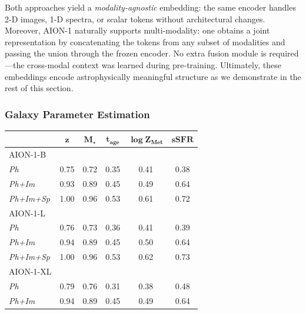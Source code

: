 \documentclass[]{polymathic}
\begin{document}
Both approaches yield a \emph{modality-agnostic} embedding: the same encoder handles 2-D images, 1-D spectra, or scalar tokens without architectural changes.  Moreover, AION-1 naturally supports multi-modality: one obtains a joint representation by concatenating the tokens from any subset of modalities and passing the union through the frozen encoder.  No extra fusion module is required—the cross-modal context was learned during pre-training. Ultimately, these embeddings encode astrophysically meaningful structure as we demonstrate in the rest of this section.

\subsubsection{Galaxy Parameter Estimation}

\begin{table}
\centering
\small
\begin{tabular}{l
                c  %
                c  %
                c  %
                c  %
                c  %
               }
\toprule
 & $\mathbf{z}$ & $\mathbf{M_\star}$ & $\mathbf{t_{age}}$ & $\mathbf{\log Z_{\!Met}}$ & $\mathbf{sSFR}$ \\
\midrule
AION-1-B & & & & & \\
\hspace{1mm}\textit{Ph}            & 0.75 & 0.72 & 0.35 & 0.41 & 0.38 \\
\hspace{1mm}\textit{Ph+Im}         & 0.93 & 0.89 & 0.45 & 0.49 & 0.64 \\
\hspace{1mm}\textit{Ph+Im+Sp}      & 1.00 & 0.96 & 0.53 & 0.61 & 0.72 \\[2pt]
AION-1-L & & & & & \\
\hspace{1mm}\textit{Ph}            & 0.76 & 0.73 & 0.36 & 0.41 & 0.39 \\
\hspace{1mm}\textit{Ph+Im}         & 0.94 & 0.89 & 0.45 & 0.50 & 0.64 \\
\hspace{1mm}\textit{Ph+Im+Sp}      & 1.00 & 0.96 & 0.53 & 0.62 & 0.73 \\[2pt]
AION-1-XL & & & & & \\
\hspace{1mm}\textit{Ph}            & 0.79 & 0.76 & 0.31 & 0.38 & 0.48 \\
\hspace{1mm}\textit{Ph+Im}         & 0.94 & 0.89 & 0.45 & 0.49 & 0.64 \\

\end{tabular}
\end{table}
\end{document}
